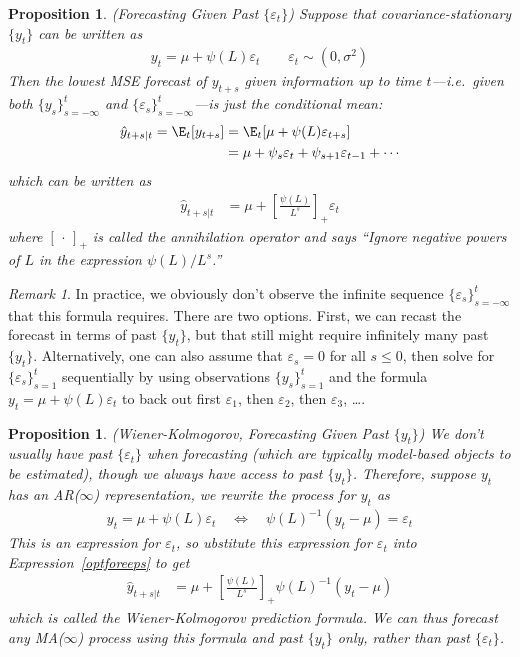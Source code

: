 \documentclass[12pt]{article}
\theoremstyle{plain}
\newtheorem{prop}[thm]{Proposition}
\theoremstyle{definition}
\theoremstyle{remark}
\newtheorem*{rmk}{Remark}
\begin{document}
\begin{prop}\emph{(Forecasting Given Past $\{\varepsilon_t\}$)}
Suppose that covariance-stationary $\{y_t\}$ can be written as
\begin{align*}
  y_t = \mu + \psi(L)\varepsilon_t
  \qquad \varepsilon_t \sim (0,\sigma^2)
\end{align*}
Then the lowest MSE forecast of $y_{t+s}$ given information up to time
$t$---i.e.\ given both $\{y_s\}_{s=-\infty}^t$ and
$\{\varepsilon_s\}_{s=-\infty}^t$---is just the conditional mean:
\begin{align*}
  \hat{y}_{t+s|t}
  = \E_t[y_{t+s}]
  &= \E_t[\mu + \psi(L)\varepsilon_{t+s}] \\
  &= \mu + \psi_s\varepsilon_t + \psi_{s+1}\varepsilon_{t-1} + \cdots
\end{align*}
which can be written as
\begin{align}
  \hat{y}_{t+s|t}
  &= \mu + \left[\frac{\psi(L)}{L^s}\right]_+\varepsilon_t
  \label{optforeeps}
\end{align}
where $[\,\cdot\,]_+$ is called the \emph{annihilation operator} and
says ``Ignore negative powers of $L$ in the expression $\psi(L)/L^s$.''
\end{prop}
\begin{rmk}
In practice, we obviously don't observe the infinite sequence
$\{\varepsilon_s\}_{s=-\infty}^t$ that this formula requires. There are
two options. First, we can recast the forecast in terms of past
$\{y_t\}$, but that still might require infinitely many past $\{y_t\}$.
Alternatively, one can also assume that $\varepsilon_s=0$ for all
$s\leq 0$, then solve for $\{\varepsilon_s\}_{s=1}^t$ sequentially by using
observations $\{y_s\}_{s=1}^t$ and the formula
$y_t = \mu + \psi(L)\varepsilon_t$ to back out first $\varepsilon_1$,
then $\varepsilon_2$, then $\varepsilon_3$, \ldots.
\end{rmk}


\begin{prop}\emph{(Wiener-Kolmogorov, Forecasting Given Past $\{y_t\}$)}
We don't usually have past $\{\varepsilon_t\}$ when forecasting (which
are typically model-based objects to be estimated), though we always
have access to past $\{y_t\}$. Therefore, suppose $y_t$ has an
AR($\infty$) representation, we rewrite the process for $y_t$ as
\begin{align*}
  y_t = \mu + \psi(L)\varepsilon_t
  \quad\iff\quad
  \psi(L)^{-1}(y_t - \mu) = \varepsilon_t
\end{align*}
This is an expression for $\varepsilon_t$, so ubstitute this expression
for $\varepsilon_t$ into Expression~\ref{optforeeps} to get
\begin{align}
  \hat{y}_{t+s|t}
  &= \mu + \left[\frac{\psi(L)}{L^s}\right]_+
  \psi(L)^{-1}(y_t - \mu)
  \label{wienerkolmogorov}
\end{align}
which is called the \emph{Wiener-Kolmogorov prediction formula}. We can
thus forecast any MA($\infty$) process using this formula and past
$\{y_t\}$ only, rather than past $\{\varepsilon_t\}$.
\end{prop}
\end{document}
